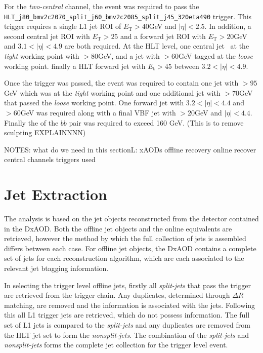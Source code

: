 		For the \textit{two-central} channel, the event was required to pass the \texttt{HLT\_j80\_bmv2c2070\_split\_\-j60\_bmv2c2085\_split\_j45\_320eta490} trigger. This trigger requires a single L1 jet ROI of $E_\text{T} > 40$GeV and $|\eta| < 2.5$. In addition, a second central jet ROI with $E_\text{T} > 25$ and a forward jet ROI with $E_\text{T} > 20$GeV and $3.1 < |\eta| < 4.9$ are both required.
		At the HLT level, one central jet \btagged\, at the \textit{tight} working point with \pt $>80$GeV, and a jet with \pt$>60$GeV tagged at the \textit{loose} working point. finally a HLT forward jet with $E_\text{t}>45$ between $3.2 < |\eta| < 4.9$.

		Once the trigger was passed, the event was required to contain one jet with \pt$>95$GeV which was \btagged at the \textit{tight} working point and one additional jet with \pt$>70$GeV that passed the \textit{loose} \btag working point. One forward jet with $3.2 < |\eta| < 4.4$ and \pt$>60$GeV was required along with a final VBF jet with \pt$>20$GeV and $|\eta| < 4.4$. Finally the \pt of the $bb$ pair was required to exceed 160 GeV. (This is to remove sculpting EXPLAINNNN)


NOTES:
what do we need in this sectionL:
	xAODs
	offline recovery
	online recover
	central channels
	triggers used






	\section{Jet Extraction}

		The analysis is based on the jet objects reconstructed from the detector contained in the DxAOD. Both the offline jet objects and the online equivalents are retrieved, however the method by which the full collection of jets is assembled differs between each case. For offline jet objects, the DxAOD contains a complete set of jets for each reconstruction algorithm, which are each associated to the relevant jet btagging information.

		In selecting the trigger level offline jets, firstly all \textit{split-jets} that pass the trigger are retrieved from the trigger chain. Any duplicates, determined through $\Delta R$ matching, are removed and the \btag information is associated with the jets. Following this all L1 trigger jets are retrieved, which do not possess \btag information. The full set of L1 jets is compared to the \textit{split-jets} and any duplicates are removed from the HLT jet set to form the \textit{nonsplit-jets}. The combination of the \textit{split-jets} and \textit{nonsplit-jets} forms the complete jet collection for the trigger level event.


